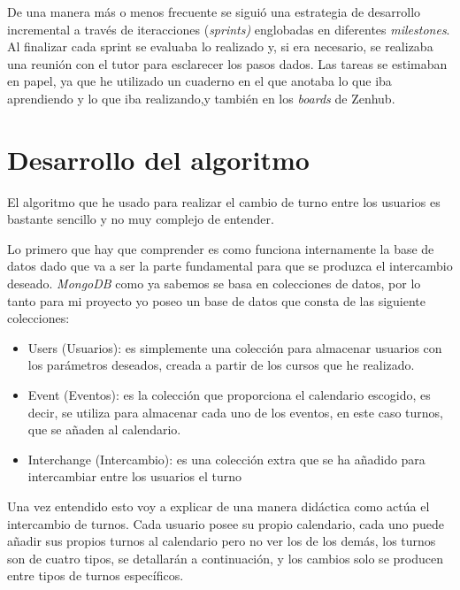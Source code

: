  
 De una manera más o menos frecuente se siguió una estrategia de desarrollo incremental a través de iteracciones (\emph{sprints)} englobadas en diferentes \emph{milestones}. Al finalizar cada sprint se evaluaba lo realizado y, si era necesario, se realizaba una reunión con el tutor para esclarecer los pasos dados. Las tareas se estimaban en papel, ya que he utilizado un cuaderno en el que anotaba lo que iba aprendiendo y lo que iba realizando,y también en  los \emph{boards} de Zenhub. 
 
   \section{Desarrollo del algoritmo}\label{algoritmo}
   El algoritmo que he usado para realizar el cambio de turno entre los usuarios es bastante sencillo y no muy complejo de entender.
   
   Lo primero que hay que comprender es como funciona internamente la base de datos dado que va a ser la parte fundamental para que se produzca el intercambio deseado. \emph{MongoDB} como ya sabemos  se basa en colecciones de datos, por lo tanto para mi proyecto yo poseo un base de datos que consta de las siguiente colecciones:
   
   
   \begin{itemize}
	\item Users (Usuarios): es simplemente una colección para almacenar usuarios con los parámetros deseados, creada a partir de los cursos que he realizado.
	\item Event (Eventos): es la colección que proporciona el calendario escogido, es decir, se utiliza para almacenar cada uno de los eventos, en este caso turnos, que se añaden al calendario.
	\item Interchange (Intercambio): es una colección extra que se ha añadido para intercambiar entre los usuarios el turno
	\end{itemize}
   
   
   Una vez entendido esto voy a explicar de una manera didáctica como actúa el intercambio de turnos. Cada usuario posee su propio calendario, cada uno puede añadir sus propios turnos al calendario pero no ver los de los demás, los turnos son de cuatro tipos, se detallarán a continuación, y los cambios solo se producen entre tipos de turnos específicos. 

